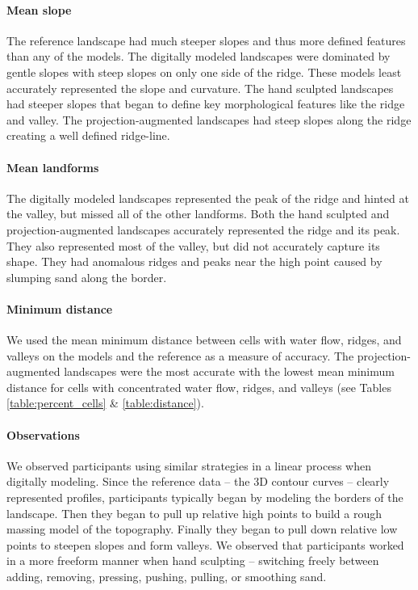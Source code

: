 \documentclass[prodmode,acmtochi]{acmsmall} %
\begin{document}
\paragraph{Mean slope}
The reference landscape had 
much steeper slopes and thus more 
defined features
than any of the models.
%
The digitally modeled landscapes
were dominated by gentle slopes
with steep slopes on only one side of the ridge.
These models
least accurately represented the slope and curvature.
% 
The hand sculpted landscapes 
had steeper slopes
that began to define key morphological features 
like the ridge and valley.
%
The projection-augmented landscapes 
had steep slopes along the ridge
creating a well defined ridge-line. 

\paragraph{Mean landforms}
The digitally modeled landscapes
represented the peak of the ridge
and hinted at the valley, 
but missed all of the other landforms.
% 
Both the hand sculpted and projection-augmented landscapes 
accurately represented the ridge and its peak.
They also represented most of the valley,
but did not accurately capture its shape. 
They had anomalous ridges and peaks 
near the high point
caused by slumping sand along the border.

\paragraph{Minimum distance}
We used
the mean minimum distance between cells
with water flow, ridges, and valleys
on the models and the reference
as a measure of accuracy. 
%
The projection-augmented landscapes 
were the most accurate
with the lowest mean minimum distance for cells with
concentrated water flow, ridges, and valleys
(see Tables \ref{table:percent_cells} \& \ref{table:distance}). 

\paragraph{Observations}
We observed participants using similar strategies in a linear process 
when digitally modeling. 
Since the reference data -- the 3D contour curves -- 
clearly represented profiles, 
participants typically began by modeling the borders %
of the landscape.
Then they began to pull up relative high points 
to build a rough massing model of the topography.
Finally they began to pull down relative low points to 
steepen slopes and form valleys.
We observed that participants 
worked in a more freeform manner 
when hand sculpting -- switching freely between
adding, removing, pressing, pushing, pulling, or smoothing
sand.
\end{document}
